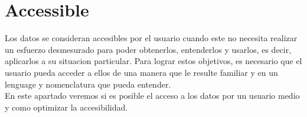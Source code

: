 \newpage
\section{Accessible}

Los datos se consideran accesibles por el usuario cuando este no necesita realizar un esfuerzo desmesurado para
poder obtenerlos, entenderlos y usarlos, es decir, aplicarlos a su situacion particular. Para lograr estos objetivos,
es necesario que el usuario pueda acceder a ellos de una manera que le resulte familiar y en un lenguage y nomenclatura
que pueda entender.\\ 

En este apartado veremos si es posible el acceso a los datos por un usuario medio y como optimizar la accesibilidad.











    
